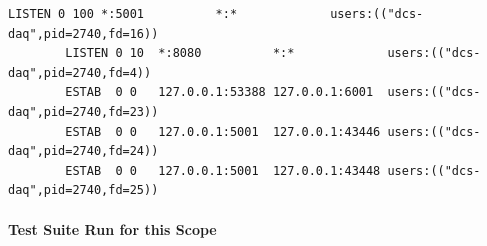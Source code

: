       \begin{lstlisting}[caption={Socket Status During DAQ Tests},
                         label={lst:test-rest-daq-ss}]
        LISTEN 0 100 *:5001          *:*             users:(("dcs-daq",pid=2740,fd=16))
        LISTEN 0 10  *:8080          *:*             users:(("dcs-daq",pid=2740,fd=4))
        ESTAB  0 0   127.0.0.1:53388 127.0.0.1:6001  users:(("dcs-daq",pid=2740,fd=23))
        ESTAB  0 0   127.0.0.1:5001  127.0.0.1:43446 users:(("dcs-daq",pid=2740,fd=24))
        ESTAB  0 0   127.0.0.1:5001  127.0.0.1:43448 users:(("dcs-daq",pid=2740,fd=25))
      \end{lstlisting}

      \paragraph{Test Suite Run for this Scope}\mbox{}\\

